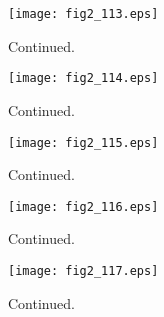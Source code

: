\documentclass[preprint]{aastex}
\begin{document}
\setcounter{figure}{1}
\begin{figure}[t]
\centering
\texttt{[image: fig2\_113.eps]}
\caption{
Continued. 
}
\label{Fig2}
\end{figure}
\clearpage



\setcounter{figure}{1}
\begin{figure}[t]
\centering
\texttt{[image: fig2\_114.eps]}
\caption{
Continued. 
}
\label{Fig2}
\end{figure}
\clearpage



\setcounter{figure}{1}
\begin{figure}[t]
\centering
\texttt{[image: fig2\_115.eps]}
\caption{
Continued. 
}
\label{Fig2}
\end{figure}
\clearpage



\setcounter{figure}{1}
\begin{figure}[t]
\centering
\texttt{[image: fig2\_116.eps]}
\caption{
Continued. 
}
\label{Fig2}
\end{figure}
\clearpage



\setcounter{figure}{1}
\begin{figure}[t]
\centering
\texttt{[image: fig2\_117.eps]}
\caption{
Continued. 
}
\label{Fig2}
\end{figure}
\clearpage
\end{document}
